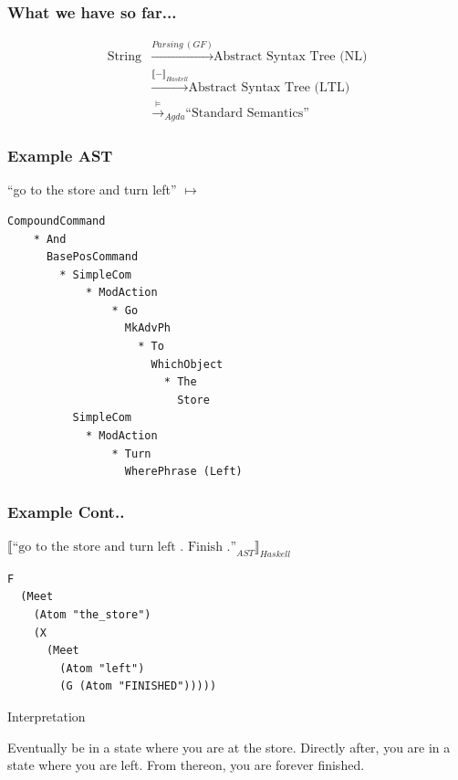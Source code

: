\documentclass{beamer}
\begin{document}
\begin{frame}
\frametitle{What we have so far...}

\begin{equation} %
\begin{split}
\text{String} & \xrightarrow{\mathit{Parsing\ (GF)}} \text{Abstract Syntax Tree (NL)}\\
 & \xrightarrow{\llbracket - \rrbracket_{Haskell}} \text{Abstract Syntax Tree (LTL)}\\
 & \xrightarrow{\vDash}_{Agda} \text{``Standard Semantics''}
\end{split}
\end{equation} 
\end{frame}


\begin{frame}[fragile]
\frametitle{Example AST}
``go to the store and turn left'' $\mapsto$
\begin{verbatim}
CompoundCommand
    * And
      BasePosCommand
        * SimpleCom
            * ModAction
                * Go
                  MkAdvPh
                    * To
                      WhichObject
                        * The
                          Store
          SimpleCom
            * ModAction
                * Turn
                  WherePhrase (Left)
\end{verbatim}
\end{frame}

\begin{frame}[fragile]
\frametitle{Example Cont..}
${\llbracket  \text{``go to the store and turn left . Finish .''}_{AST} \rrbracket_{Haskell}}$
\begin{verbatim}
F
  (Meet
    (Atom "the_store") 
    (X 
      (Meet 
        (Atom "left") 
        (G (Atom "FINISHED")))))
\end{verbatim}

\begin{exampleblock}{Interpretation}
  
Eventually be in a state where you are at the store. Directly after, you are in
a state where you are left. From thereon, you are forever finished.

\end{exampleblock}
\end{frame}
\end{document}
